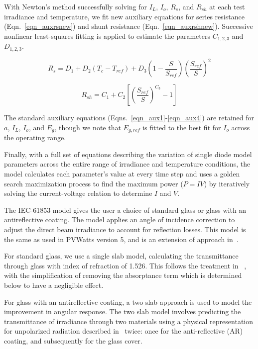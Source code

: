 \documentclass[12pt,letterpaper]{article}
\begin{document}
With Newton's method successfully solving for $I_L$, $I_o$, $R_s$, and $R_{sh}$ at each test irradiance and temperature, we fit new auxiliary equations for series resistance (Eqn.~\ref{eqn_auxrsnew}) and shunt resistance (Eqn.~\ref{eqn_auxrshnew}).  Successive nonlinear least-squares fitting is applied to estimate the parameters $C_{1,2,3}$ and $D_{1,2,3}$.

\begin{equation}\label{eqn_auxrsnew}
R_s = D_1 + D_2(T_c-T_{ref}) + D_3\left( 1-\frac{S}{S_{ref}}\right)\left(\frac{S_{ref}}{S}\right)^2
\end{equation}

\begin{equation}\label{eqn_auxrshnew}
R_{sh} = C_1 + C_2\left[ \left(\frac{S_{ref}}{S}\right)^{C_3}-1 \right]
\end{equation}

The standard auxiliary equations (Eqns.~\ref{eqn_aux1}-\ref{eqn_aux4}) are retained for $a$, $I_L$, $I_o$, and $E_g$, though we note that $E_{g,ref}$ is fitted to the best fit for $I_o$ across the operating range.  

Finally, with a full set of equations describing the variation of single diode model parameters across the entire range of irradiance and temperature conditions, the model calculates each parameter's value at every time step and uses a golden search maximization process to find the maximum power ($P=IV$) by iteratively solving the current-voltage relation to determine $I$ and $V$.  

The IEC-61853 model gives the user a choice of standard glass or glass with an antireflective coating.  The model applies an angle of incidence correction to adjust the direct beam irradiance to account for reflection losses.  This model is the same as used in PVWatts version 5, and is an extension of approach in~\cite{desoto2004a}.

For standard glass, we use a single slab model, calculating the transmittance through glass with index of refraction of 1.526.  This follows the treatment in ~\cite{desoto2004a}, with the simplification of removing the absorptance term which is determined below to have a negligible effect.

For glass with an antireflective coating, a two slab approach is used to model the improvement in angular response.  The two slab model involves predicting the transmittance of irradiance through two materials using a physical representation for unpolarized radiation described in~\cite{desoto2004a} twice: once for the anti-reflective (AR) coating, and subsequently for the glass cover.
        
\end{document}
